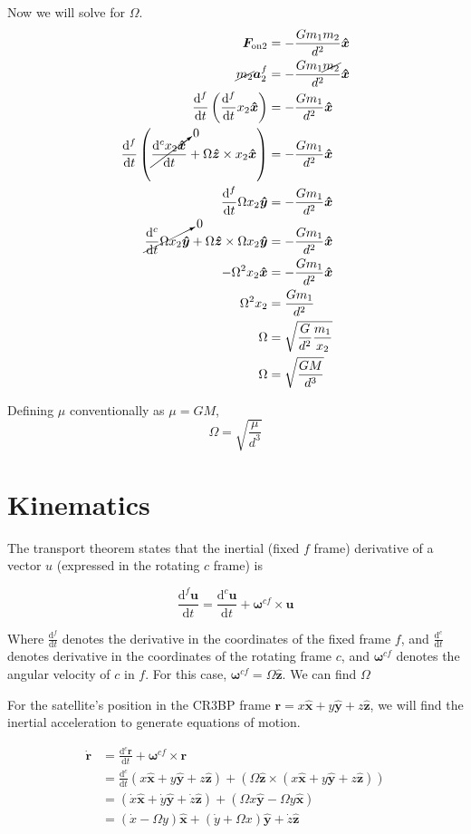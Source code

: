 \documentclass{article}
\newcommand{\dd}[2]{\frac{\mathrm{d}#1}{\mathrm{d}#2}}
\newcommand{\vv}[1]{\boldsymbol{#1}}
\newcommand{\vh}[1]{\boldsymbol{\hat{#1}}}
\begin{document}
Now we will solve for $\Omega$.
\[\begin{aligned}
    \vv{F_{\text{on2}}}&=-\frac{Gm_1m_2}{d^2}\vh{x}\\
    \cancel{m_2}\vv{a}_2^f&=-\frac{Gm_1\cancel{m_2}}{d^2}\vh{x}\\
    \dd{^f}{t}\left(\dd{^f}{t}x_2\vh{x}\right)&=-\frac{Gm_1}{d^2}\vh{x}\\
    \dd{^f}{t}\left(\cancelto{0}{\dd{^c x_2\vh{x}}{t}}+\Omega\vh{z}\times x_2\vh{x}\right)&=-\frac{Gm_1}{d^2}\vh{x}\\
    \dd{^f}{t}\Omega x_2\vh{y}&=-\frac{Gm_1}{d^2}\vh{x}\\
    \cancelto{0}{\dd{^c}{t}\Omega x_2 \vh{y}}+\Omega\vh{z}\times\Omega x_2\vh{y}&=-\frac{Gm_1}{d^2}\vh{x}\\
    -\Omega^2 x_2\vh{x}&=-\frac{Gm_1}{d^2}\vh{x}\\
    \Omega^2x_2&=\frac{Gm_1}{d^2}\\
    \Omega&=\sqrt{\frac{G}{d^2}\frac{m_1}{x_2}}\\
    \Omega&=\sqrt{\frac{GM}{d^3}}\\
\end{aligned}\]

Defining $\mu$ conventionally as $\mu=GM$,
\[\boxed{\Omega=\sqrt{\frac{\mu}{d^3}}}\]

\section*{Kinematics}
The transport theorem states that the inertial (fixed $f$ frame) derivative of a vector $u$ (expressed in the rotating $c$ frame) is

\[\dd{^f \vv{u}}{t}=\dd{^c\vv{u}}{t}+\vv{\omega}^{cf}\times\vv{u}\]

Where $\dd{^f}{t}$ denotes the derivative in the coordinates of the fixed frame $f$, and $\dd{^c}{t}$ denotes derivative in the coordinates of the rotating frame $c$, and $\vv{\omega}^{cf}$ denotes the angular velocity of $c$ in $f$. For this case, $\vv{\omega}^{cf}=\Omega\vh{z}$. We can find $\Omega$

For the satellite's position in the CR3BP frame $\vv{r}=x\vh{x}+y\vh{y}+z\vh{z}$, we will find the inertial acceleration to generate equations of motion.

\[
\begin{aligned}
    \vv{\dot{r}}&=\dd{^c\vv{r}}{t}+\vv{\omega}^{cf}\times\vv{r}\\
    &=\dd{^c}{t}\left(x\vh{x}+y\vh{y}+z\vh{z}\right)+\left(\Omega\vh{z}\times\left(x\vh{x}+y\vh{y}+z\vh{z}\right)\right)\\
    &=\left(\dot{x}\vh{x}+\dot{y}\vh{y}+\dot{z}\vh{z}\right)+\left(\Omega x\vh{y}-\Omega y\vh{x}\right)\\
    &=\left(\dot{x}-\Omega y\right)\vh{x}+\left(\dot{y}+\Omega x\right)\vh{y}+\dot{z}\vh{z}
\end{aligned}
\]
\end{document}
